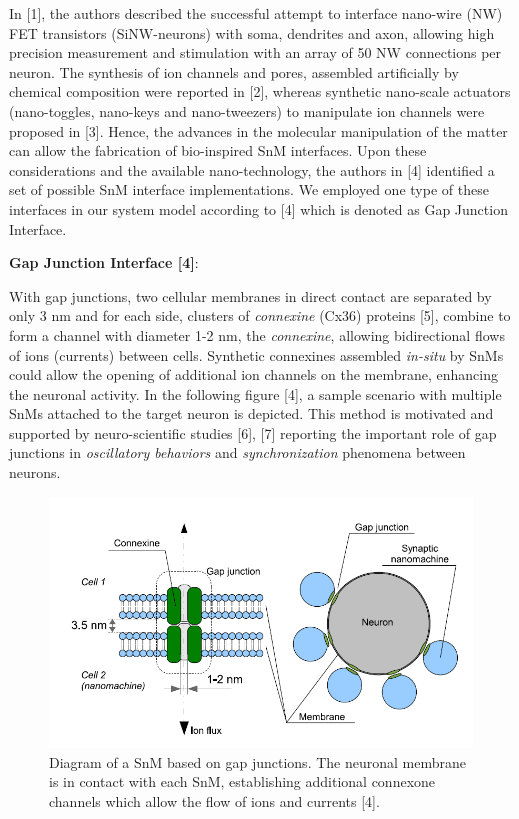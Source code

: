 \documentclass[12pt, letterpaper]{article}
\begin{document}
\clearpage
In [1], the authors described the successful attempt to interface nano-wire (NW) FET transistors (SiNW-neurons) with soma, dendrites and axon, allowing high precision measurement and
stimulation with an array of 50 NW connections per neuron. The synthesis of ion channels and pores, assembled artificially by chemical composition were reported in [2], whereas synthetic nano-scale actuators (nano-toggles, nano-keys and nano-tweezers) to manipulate ion channels were proposed in [3].
Hence, the advances in the molecular manipulation of the matter can allow the fabrication of bio-inspired SnM interfaces.
Upon these considerations and the available nano-technology, the authors in [4] identified a set of possible SnM interface implementations. We employed one type of these interfaces in our system model according to [4] which is denoted as Gap Junction Interface.


\textbf{Gap Junction Interface [4]}:

With gap junctions, two cellular membranes in direct contact are separated by only 3 nm and for each side, clusters of \textit{connexine} (Cx36) proteins [5], combine to form a channel with diameter 1-2 nm, the \textit{connexine}, allowing bidirectional flows of ions (currents) between cells. Synthetic connexines assembled \textit{in-situ} by SnMs could allow the opening of additional ion channels on the membrane, enhancing the neuronal activity. In the following figure [4], a sample scenario with multiple SnMs attached to the target neuron is depicted. This method is motivated and supported by neuro-scientific studies [6], [7] reporting the important role of gap junctions in \textit{oscillatory behaviors} and \textit{synchronization} phenomena between neurons.

\begin{figure}[H]
\centering
\includegraphics[width=.78\textwidth,height=.3\textheight]{Gap.png}
\caption{ Diagram of a SnM based on gap junctions. The neuronal membrane is in contact with each SnM, establishing additional connexone channels which allow the flow of ions and currents [4].}
\label{new_1}
\end{figure}
\end{document}

